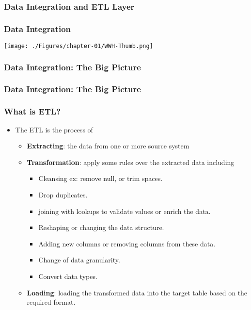 \subsubsection{Data Integration and ETL Layer}

\begin{frame}
	\frametitle{Data Integration}

	\texttt{[image: ./Figures/chapter-01/WWH-Thumb.png]}

\end{frame}
\begin{frame}
	\frametitle{Data Integration: The Big Picture}

	

\end{frame}
\begin{frame}
	\frametitle{Data Integration: The Big Picture}

	

\end{frame}
\begin{frame}
	\frametitle{What is ETL?}

	\begin{itemize}
		\item The ETL is the process of
		\begin{itemize}
			\item  \textbf{Extracting}: the data from one or more source system
			\item  \textbf{Transformation}: apply some rules over the extracted data including
			\begin{itemize}
				\item Cleansing ex: remove null, or trim spaces.
				\item Drop duplicates.
				\item joining with lookups to validate values or enrich the data.
				\item Reshaping or changing the data structure.
				\item Adding new columns or removing columns from these data.
				\item Change of data granularity.
				\item Convert data types.
			\end{itemize}
			\item \textbf{Loading}: loading the transformed data into the target table based on the required format.
		\end{itemize}
	\end{itemize}

\end{frame}
